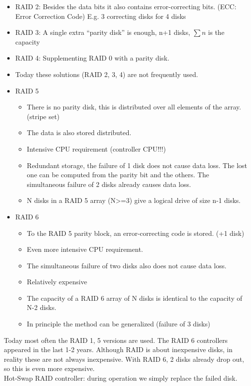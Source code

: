 \documentclass[margin=0px]{article}
\begin{document}
\begin{itemize}
\begin{itemize}
              \item RAID 0+1: Let us take two of a RAID 0 joined disk group.
              \item The controllers often provide one or the other, since either way there is mirroring, that is, it is expensive, so it is rarely used.
          \end{itemize}
    \item RAID 2: Besides the data bits it also contains error-correcting bits. (ECC: Error Correction Code) E.g. 3 correcting disks for 4 disks
    \item RAID 3: A single extra ``parity disk'' is enough, n+1 disks, $\sum{n}$ is the capacity
    \item RAID 4: Supplementing RAID 0 with a parity disk.
    \item Today these solutions (RAID 2, 3, 4) are not frequently used.
    \item RAID 5
          \begin{itemize}
              \item There is no parity disk, this is distributed over all elements of the array. (stripe set)
              \item The data is also stored distributed.
              \item Intensive CPU requirement (controller CPU!!!)
              \item Redundant storage, the failure of 1 disk does not cause data loss. The lost one can be computed from the parity bit and the others. The simultaneous failure of 2 disks already causes data loss.
              \item N disks in a RAID 5 array (N>=3) give a logical drive of size n-1 disks.
          \end{itemize}
    \item RAID 6
          \begin{itemize}
              \item To the RAID 5 parity block, an error-correcting code is stored. (+1 disk)
              \item Even more intensive CPU requirement.
              \item The simultaneous failure of two disks also does not cause data loss.
              \item Relatively expensive
              \item The capacity of a RAID 6 array of N disks is identical to the capacity of N-2 disks.
              \item In principle the method can be generalized (failure of 3 disks)
          \end{itemize}
\end{itemize}
Today most often the RAID 1, 5 versions are used. The RAID 6 controllers appeared in the last 1-2 years. Although RAID is about inexpensive disks, in reality these are not always inexpensive. With RAID 6, 2 disks already drop out, so this is even more expensive. \\
Hot-Swap RAID controller: during operation we simply replace the failed disk.
\end{document}
